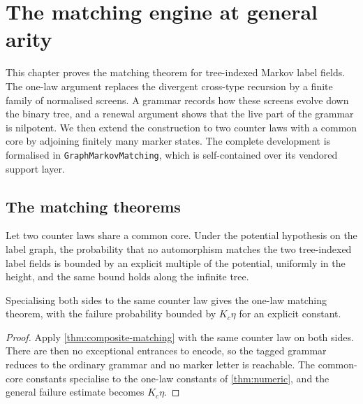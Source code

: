 \chapter{The matching engine at general arity}
\label{ch:engine}

This chapter proves the matching theorem for tree-indexed Markov label fields. The one-law
argument replaces the divergent cross-type recursion by a finite family of normalised screens.
A grammar records how these screens evolve down the binary tree, and a renewal argument shows
that the live part of the grammar is nilpotent. We then extend the construction to two counter
laws with a common core by adjoining finitely many marker states. The complete development is
formalised in \texttt{GraphMarkovMatching}, which is self-contained over its vendored support
layer.

\section{The matching theorems}

\begin{theorem}
\label{thm:composite-matching}
\leanok
{}
Let two counter laws share a common core. Under the potential hypothesis on the label graph,
the probability that no automorphism matches the two tree-indexed label fields is bounded by an
explicit multiple of the potential, uniformly in the height, and the same bound holds along the
infinite tree.
\end{theorem}

\begin{corollary}
\label{thm:main-matching}
\leanok
Specialising both sides to the same counter law gives the one-law matching theorem, with the
failure probability bounded by $K_c\eta$ for an explicit constant.
\end{corollary}

\begin{proof}
\leanok
{}
Apply \cref{thm:composite-matching} with the same counter law on both sides. There are then no
exceptional entrances to encode, so the tagged grammar reduces to the ordinary grammar and no
marker letter is reachable. The common-core constants specialise to the one-law constants of
\cref{thm:numeric}, and the general failure estimate becomes $K_c\eta$.
\end{proof}

